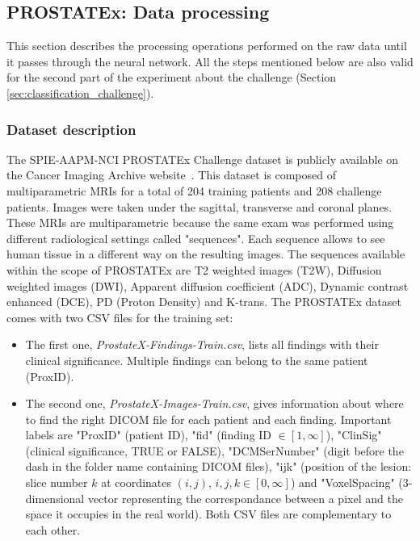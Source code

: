 \subsection{PROSTATEx: Data processing}
\label{sec:prostatex_data_processing}
\setlength{\marginparwidth}{3cm}\leavevmode {}This section describes the processing operations performed on the raw data until it passes through the neural network. All the steps mentioned below are also valid for the second part of the experiment about the challenge (Section \ref{sec:classification_challenge}).


\subsubsection{Dataset description}
\label{sec:prostatex_dataset_description}
\setlength{\marginparwidth}{3cm}\leavevmode {}The SPIE-AAPM-NCI PROSTATEx Challenge dataset is publicly available on the Cancer Imaging Archive website~\cite{33, 34, 35}. This dataset is composed of multiparametric MRIs for a total of 204 training patients and 208 challenge patients. Images were taken under the sagittal, transverse and coronal planes. These MRIs are multiparametric because the same exam was performed using different radiological settings called "sequences". Each sequence allows to see human tissue in a different way on the resulting images. The sequences available within the scope of PROSTATEx are T2 weighted images (T2W), Diffusion weighted images (DWI), Apparent diffusion coefficient (ADC), Dynamic contrast enhanced (DCE), PD (Proton Density) and K-trans. The PROSTATEx dataset comes with two CSV files for the training set:
\begin{itemize}
\item The first one, \textit{ProstateX-Findings-Train.csv}, lists all findings with their clinical significance. Multiple findings can belong to the same patient (ProxID).

\item The second one, \textit{ProstateX-Images-Train.csv}, gives information about where to find the right DICOM file for each patient and each finding. Important labels are "ProxID" (patient ID), "fid" (finding ID $\in [1,\infty]$), "ClinSig" (clinical significance, TRUE or FALSE), "DCMSerNumber" (digit before the dash in the folder name containing DICOM files), "ijk" (position of the lesion: slice number $k$ at coordinates $(i,j)$, $i,j,k \in [0,\infty]$) and "VoxelSpacing" (3-dimensional vector representing the correspondance between a pixel and the space it occupies in the real world). Both CSV files are complementary to each other. 
\end{itemize}

